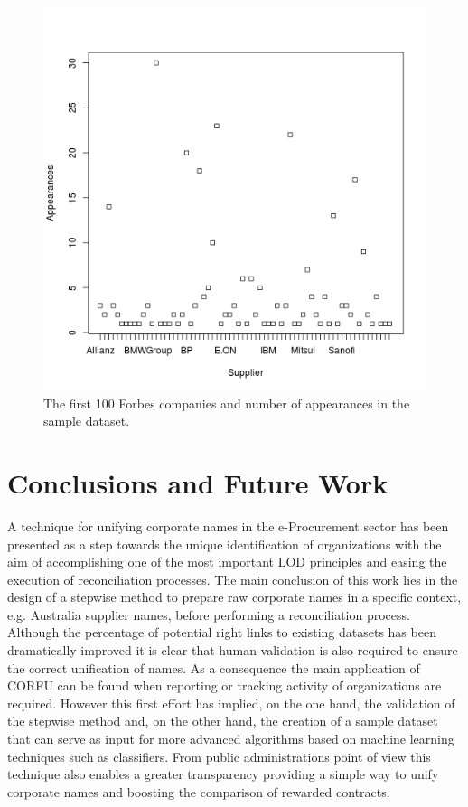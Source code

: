 \documentclass{llncs}
\begin{document}
\begin{figure}[ht]
\begin{minipage}[b]{0.45\linewidth}
	\includegraphics[width=\textwidth]{./imgs/corfu-forbes-100}
\caption{The first 100 Forbes companies and number of appearances in the sample dataset. }
 \label{fig:results-graph-4}
\end{minipage}
\end{figure}




\section{Conclusions and Future Work}
A technique for unifying corporate names in the e-Procurement sector has been 
presented as a step towards the unique identification of organizations 
with the aim of accomplishing one of the most important LOD principles 
and easing the execution of reconciliation processes. The main conclusion of this work 
lies in the design of a stepwise method to prepare raw corporate names in a specific 
context, e.g. Australia supplier names, before performing a reconciliation process. 
Although the percentage of potential right links to existing datasets has been dramatically 
improved it is clear that human-validation is also required to ensure the 
correct unification of names. As a consequence the main application of CORFU 
can be found when reporting or tracking activity of organizations are required. 
However this first effort has implied, on the one hand, the validation 
of the stepwise method and, on the other hand, the creation of a sample dataset 
that can serve as input for more advanced algorithms based on machine learning 
techniques such as classifiers. From public administrations point of view 
this technique also enables a greater transparency providing a simple 
way to unify corporate names and boosting the comparison of rewarded contracts.
\end{document}
